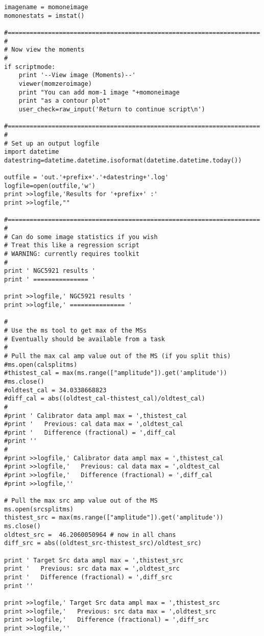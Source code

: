 \begin{verbatim}
imagename = momoneimage
momonestats = imstat()

#=====================================================================
#
# Now view the moments
#
if scriptmode:
    print '--View image (Moments)--'
    viewer(momzeroimage)
    print "You can add mom-1 image "+momoneimage
    print "as a contour plot"
    user_check=raw_input('Return to continue script\n')

#=====================================================================
#
# Set up an output logfile
import datetime
datestring=datetime.datetime.isoformat(datetime.datetime.today())

outfile = 'out.'+prefix+'.'+datestring+'.log'
logfile=open(outfile,'w')
print >>logfile,'Results for '+prefix+' :'
print >>logfile,""

#=====================================================================
#
# Can do some image statistics if you wish
# Treat this like a regression script
# WARNING: currently requires toolkit
#
print ' NGC5921 results '
print ' =============== '

print >>logfile,' NGC5921 results '
print >>logfile,' =============== '

#
# Use the ms tool to get max of the MSs
# Eventually should be available from a task
#
# Pull the max cal amp value out of the MS (if you split this)
#ms.open(calsplitms)
#thistest_cal = max(ms.range(["amplitude"]).get('amplitude'))
#ms.close()
#oldtest_cal = 34.0338668823
#diff_cal = abs((oldtest_cal-thistest_cal)/oldtest_cal)
#
#print ' Calibrator data ampl max = ',thistest_cal
#print '   Previous: cal data max = ',oldtest_cal
#print '   Difference (fractional) = ',diff_cal
#print ''
#
#print >>logfile,' Calibrator data ampl max = ',thistest_cal
#print >>logfile,'   Previous: cal data max = ',oldtest_cal
#print >>logfile,'   Difference (fractional) = ',diff_cal
#print >>logfile,''

# Pull the max src amp value out of the MS
ms.open(srcsplitms)
thistest_src = max(ms.range(["amplitude"]).get('amplitude'))
ms.close()
oldtest_src =  46.2060050964 # now in all chans
diff_src = abs((oldtest_src-thistest_src)/oldtest_src)

print ' Target Src data ampl max = ',thistest_src
print '   Previous: src data max = ',oldtest_src
print '   Difference (fractional) = ',diff_src
print ''

print >>logfile,' Target Src data ampl max = ',thistest_src
print >>logfile,'   Previous: src data max = ',oldtest_src
print >>logfile,'   Difference (fractional) = ',diff_src
print >>logfile,''


\end{verbatim}
